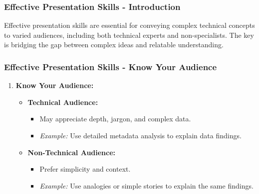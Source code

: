 \documentclass[aspectratio=169]{beamer}
\begin{document}
\begin{frame}[fragile]
    \frametitle{Effective Presentation Skills - Introduction}
    Effective presentation skills are essential for conveying complex technical concepts to varied audiences, including both technical experts and non-specialists. The key is bridging the gap between complex ideas and relatable understanding.
\end{frame}

\begin{frame}[fragile]
    \frametitle{Effective Presentation Skills - Know Your Audience}
    \begin{enumerate}
        \item \textbf{Know Your Audience:}
        \begin{itemize}
            \item \textbf{Technical Audience:} 
            \begin{itemize}
                \item May appreciate depth, jargon, and complex data.
                \item \textit{Example:} Use detailed metadata analysis to explain data findings.
            \end{itemize}
            \item \textbf{Non-Technical Audience:}
            \begin{itemize}
                \item Prefer simplicity and context.
                \item \textit{Example:} Use analogies or simple stories to explain the same findings.
            \end{itemize}
        \end{itemize}
    \end{enumerate}
\end{frame}
\end{document}
